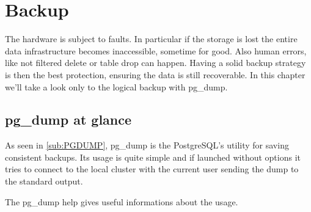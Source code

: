 \chapter{Backup}
The hardware is subject to faults. In particular if the storage is lost the entire data 
infrastructure becomes inaccessible, sometime for good. Also human errors, like not filtered 
delete or table drop can happen. Having a solid backup strategy is then the best protection, 
ensuring the data is still recoverable. In this chapter we'll take a look only to the logical 
backup with pg\_dump. 

\section{pg\_dump at glance}
\label{sec:PGDUMP}
As seen in \ref{sub:PGDUMP}, pg\_dump is the PostgreSQL's utility for saving consistent backups. 
Its usage is quite simple and if launched without options it tries to connect to the local cluster 
with the current user sending the dump to the standard output.\newline

The pg\_dump help gives useful informations about the usage.

